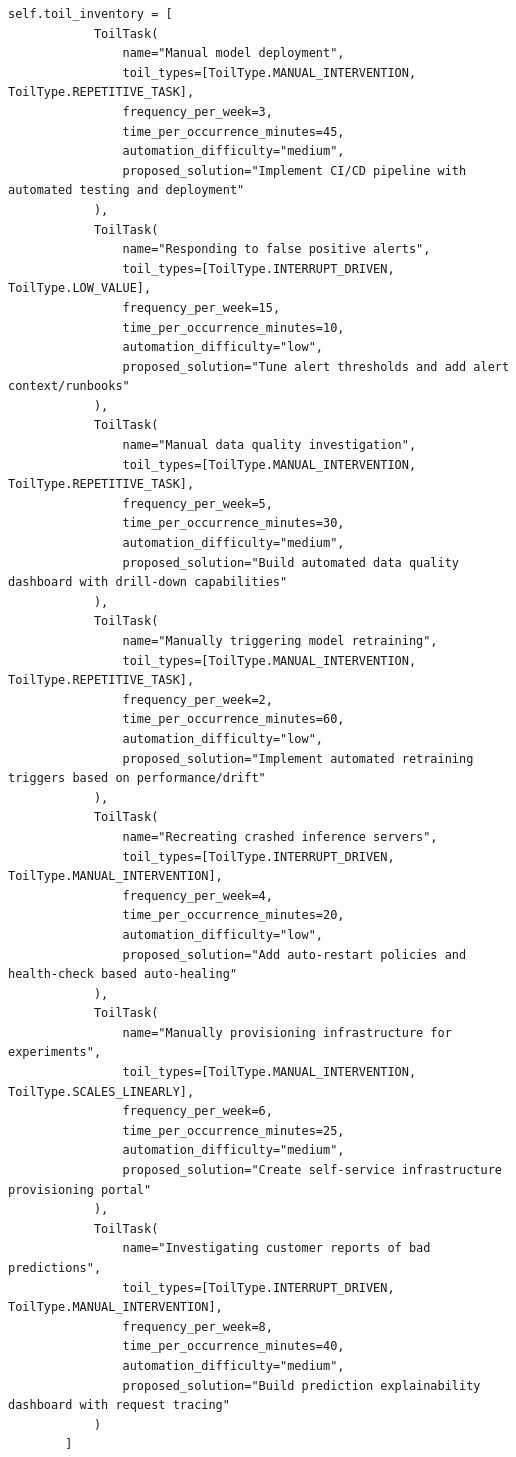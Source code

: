 \begin{lstlisting}[style=python, caption={Toil identification and reduction framework}]
        self.toil_inventory = [
            ToilTask(
                name="Manual model deployment",
                toil_types=[ToilType.MANUAL_INTERVENTION, ToilType.REPETITIVE_TASK],
                frequency_per_week=3,
                time_per_occurrence_minutes=45,
                automation_difficulty="medium",
                proposed_solution="Implement CI/CD pipeline with automated testing and deployment"
            ),
            ToilTask(
                name="Responding to false positive alerts",
                toil_types=[ToilType.INTERRUPT_DRIVEN, ToilType.LOW_VALUE],
                frequency_per_week=15,
                time_per_occurrence_minutes=10,
                automation_difficulty="low",
                proposed_solution="Tune alert thresholds and add alert context/runbooks"
            ),
            ToilTask(
                name="Manual data quality investigation",
                toil_types=[ToilType.MANUAL_INTERVENTION, ToilType.REPETITIVE_TASK],
                frequency_per_week=5,
                time_per_occurrence_minutes=30,
                automation_difficulty="medium",
                proposed_solution="Build automated data quality dashboard with drill-down capabilities"
            ),
            ToilTask(
                name="Manually triggering model retraining",
                toil_types=[ToilType.MANUAL_INTERVENTION, ToilType.REPETITIVE_TASK],
                frequency_per_week=2,
                time_per_occurrence_minutes=60,
                automation_difficulty="low",
                proposed_solution="Implement automated retraining triggers based on performance/drift"
            ),
            ToilTask(
                name="Recreating crashed inference servers",
                toil_types=[ToilType.INTERRUPT_DRIVEN, ToilType.MANUAL_INTERVENTION],
                frequency_per_week=4,
                time_per_occurrence_minutes=20,
                automation_difficulty="low",
                proposed_solution="Add auto-restart policies and health-check based auto-healing"
            ),
            ToilTask(
                name="Manually provisioning infrastructure for experiments",
                toil_types=[ToilType.MANUAL_INTERVENTION, ToilType.SCALES_LINEARLY],
                frequency_per_week=6,
                time_per_occurrence_minutes=25,
                automation_difficulty="medium",
                proposed_solution="Create self-service infrastructure provisioning portal"
            ),
            ToilTask(
                name="Investigating customer reports of bad predictions",
                toil_types=[ToilType.INTERRUPT_DRIVEN, ToilType.MANUAL_INTERVENTION],
                frequency_per_week=8,
                time_per_occurrence_minutes=40,
                automation_difficulty="medium",
                proposed_solution="Build prediction explainability dashboard with request tracing"
            )
        ]


\end{lstlisting}
